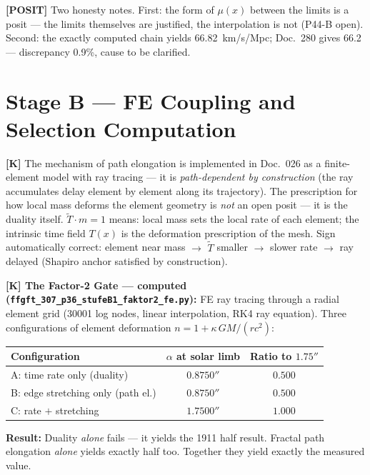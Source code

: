 \medskip
\textbf{[POSIT]} Two honesty notes.
First: the form of $\mu(x)$ between the limits is a posit —
the limits themselves are justified, the interpolation is not
(P44-B open).
Second: the exactly computed chain yields 66.82~km/s/Mpc;
Doc.~280 gives 66.2 — discrepancy 0.9\%, cause to be clarified.

\section{Stage B — FE Coupling and Selection Computation}

\textbf{[K]} The mechanism of path elongation is implemented in
Doc.~026 as a finite-element model with ray tracing — it is
\emph{path-dependent by construction} (the ray accumulates delay
element by element along its trajectory).
The prescription for how local mass deforms the element geometry is
\emph{not} an open posit — it is the duality itself. $\tilde T \cdot m = 1$
means: local mass sets the local rate of each element; the intrinsic
time field $T(x)$ is the deformation prescription of the mesh. Sign
automatically correct: element near mass $\to$ $\tilde T$ smaller
$\to$ slower rate $\to$ ray delayed (Shapiro anchor satisfied by
construction).

\medskip
\textbf{[K] The Factor-2 Gate — computed
(\texttt{ffgft\_307\_p36\_stufeB1\_faktor2\_fe.py}):}
FE ray tracing through a radial element grid (30001 log nodes,
linear interpolation, RK4 ray equation). Three configurations of
element deformation $n = 1 + \kappa\,GM/(rc^2)$:

\begin{center}
\begin{tabular}{lcc}
\toprule
Configuration & $\alpha$ at solar limb & Ratio to $1.75''$\\
\midrule
A: time rate only (duality)         & $0.8750''$ & $0.500$\\
B: edge stretching only (path el.)  & $0.8750''$ & $0.500$\\
C: rate $+$ stretching              & $1.7500''$ & $1.000$\\
\bottomrule
\end{tabular}
\end{center}

\textbf{Result:} Duality \emph{alone} fails — it yields the 1911 half
result. Fractal path elongation \emph{alone} yields exactly half too.
Together they yield exactly the measured value.

